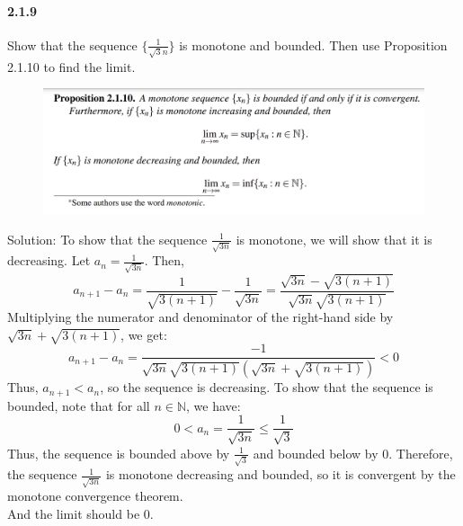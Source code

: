 \documentclass{article}
\begin{document}
\paragraph{2.1.9}
Show that the sequence $\{\frac{1}{\sqrt{3}{n}}\}$ is monotone and bounded. Then use Proposition 2.1.10 to find the limit.\\
\begin{figure}[H]
    \centering
    \includegraphics{0148}
\end{figure}
Solution:
To show that the sequence ${\frac{1}{\sqrt{3n}}}$ is monotone, we will show that it is decreasing. Let $a_n = \frac{1}{\sqrt{3n}}$. Then,
$$a_{n+1} - a_n = \frac{1}{\sqrt{3(n+1)}} - \frac{1}{\sqrt{3n}} = \frac{\sqrt{3n} - \sqrt{3(n+1)}}{\sqrt{3n}\sqrt{3(n+1)}}$$
Multiplying the numerator and denominator of the right-hand side by $\sqrt{3n} + \sqrt{3(n+1)}$, we get:
$$a_{n+1} - a_n = \frac{-1}{\sqrt{3n} \sqrt{3(n+1)}(\sqrt{3n} + \sqrt{3(n+1)})} < 0$$
Thus, $a_{n+1} < a_n$, so the sequence is decreasing.
To show that the sequence is bounded, note that for all $n \in \mathbb{N}$, we have:
$$0 < a_n = \frac{1}{\sqrt{3n}} \leq \frac{1}{\sqrt{3}}$$
Thus, the sequence is bounded above by $\frac{1}{\sqrt{3}}$ and bounded below by 0. Therefore, the sequence ${\frac{1}{\sqrt{3n}}}$ is monotone decreasing and bounded, so it is convergent by the monotone convergence theorem.\\
And the limit should be 0.
\end{document}
